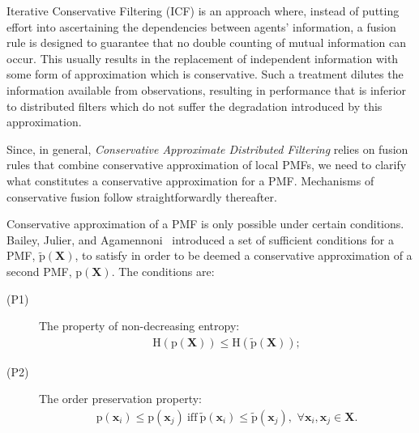\documentclass[journal]{IEEEtran}
\newcommand{\vect}[1]{{\mathbf{#1}}}
\theoremstyle{remark}
\newcommand{\pr}{\textrm{p}}
\theoremstyle{definition}
\begin{document}
Iterative Conservative Filtering  (ICF) is an approach where, instead of
putting effort into ascertaining the dependencies between agents' information,
a fusion rule is designed to guarantee that no double counting of mutual
information can occur.  This usually results in the replacement of independent
information with some form of approximation which is conservative.  Such a
treatment dilutes the information available from observations, resulting in
performance that is inferior to distributed filters which do not suffer the
degradation introduced by this approximation.

Since, in general, \emph{Conservative Approximate Distributed Filtering} relies
on fusion rules that combine conservative approximation of local PMFs, we need
to clarify what constitutes a conservative approximation for a PMF. 
Mechanisms of conservative fusion follow straightforwardly thereafter. 

Conservative approximation of a PMF is only possible under certain conditions.
Bailey, Julier, and Agamennoni~\cite{bailey2012conservative} introduced a set of
sufficient conditions for a PMF, $\tilde{\pr}(\vect{X})$, to satisfy in order to
be deemed a conservative approximation of a second PMF, $\pr(\vect{X})$. The
conditions are:
\begin{description}
\item [(P1)] The property of non-decreasing entropy:
$$\begin{aligned}
\text{H}(\pr(\vect{X})) \leq \text{H}(\tilde{\pr}(\vect{X}));
\end{aligned}$$
\item [(P2)] The order preservation property: 
$$\begin{aligned}
\pr(\vect{x}_i) \leq \pr(\vect{x}_j) \ \text{iff}\  \tilde{\pr}(\vect{x}_i) \leq \tilde{\pr}(\vect{x}_j), \,\, \forall \vect{x}_i,\vect{x}_j\in\vect{X}.
 \end{aligned}$$
\end{description}
\end{document}
